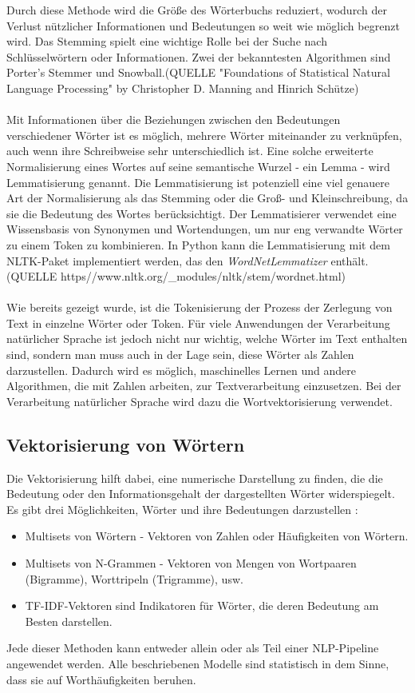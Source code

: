  Durch diese Methode wird die Größe des Wörterbuchs reduziert, wodurch der Verlust nützlicher Informationen und Bedeutungen so weit wie möglich begrenzt wird. 
 Das Stemming spielt eine wichtige Rolle bei der Suche nach Schlüsselwörtern oder Informationen. 
Zwei der bekanntesten Algorithmen sind Porter's Stemmer und Snowball.(QUELLE "Foundations of Statistical Natural Language Processing" by Christopher D. Manning and Hinrich Schütze)\\\\
Mit Informationen über die Beziehungen zwischen den Bedeutungen verschiedener Wörter ist es möglich, mehrere Wörter miteinander zu verknüpfen, auch wenn ihre Schreibweise sehr unterschiedlich ist. 
Eine solche erweiterte Normalisierung eines Wortes auf seine semantische Wurzel - ein Lemma - wird Lemmatisierung genannt. 
Die Lemmatisierung ist potenziell eine viel genauere Art der Normalisierung als das Stemming oder die Groß- und Kleinschreibung, da sie die Bedeutung des Wortes berücksichtigt. 
Der Lemmatisierer verwendet eine Wissensbasis von Synonymen und Wortendungen, um nur eng verwandte Wörter zu einem Token zu kombinieren. 
In Python kann die Lemmatisierung mit dem \ac{NLTK}-Paket implementiert werden, das den \textit{WordNetLemmatizer} enthält. (QUELLE https\://www.nltk.org/\_modules/nltk/stem/wordnet.html)\\\\
Wie bereits gezeigt wurde, ist die Tokenisierung der Prozess der Zerlegung von Text in einzelne Wörter oder Token. 
Für viele Anwendungen der Verarbeitung natürlicher Sprache ist jedoch nicht nur wichtig, welche Wörter im Text enthalten sind, sondern man muss auch in der Lage sein, diese Wörter als Zahlen darzustellen. 
Dadurch wird es möglich, maschinelles Lernen und andere Algorithmen, die mit Zahlen arbeiten, zur Textverarbeitung einzusetzen. 
Bei der Verarbeitung natürlicher Sprache wird dazu die Wortvektorisierung verwendet.
\subsection{Vektorisierung von Wörtern}
Die Vektorisierung hilft dabei, eine numerische Darstellung zu finden, die die Bedeutung oder den Informationsgehalt der dargestellten Wörter widerspiegelt. 
Es gibt drei Möglichkeiten, Wörter und ihre Bedeutungen darzustellen \cite{lane_natural_2019}:
\begin{itemize}
    \item Multisets von Wörtern - Vektoren von Zahlen oder Häufigkeiten von Wörtern. 
    \item Multisets von N-Grammen - Vektoren von Mengen von Wortpaaren (Bigramme), Worttripeln (Trigramme), usw.
    \item \ac{TF}-\ac{IDF}-Vektoren sind Indikatoren für Wörter, die deren Bedeutung am Besten darstellen.
\end{itemize}
Jede dieser Methoden kann entweder allein oder als Teil einer \ac{NLP}-Pipeline angewendet werden. 
Alle beschriebenen Modelle sind statistisch in dem Sinne, dass sie auf Worthäufigkeiten beruhen.
